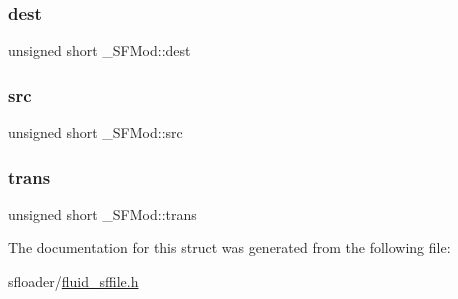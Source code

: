 \mbox{\label{struct__SFMod_a166eb7ef238826eb667d692d7ded9abb}} 
\subsubsection{\texorpdfstring{dest}{dest}}
{\footnotesize\ttfamily unsigned short \+\_\+\+S\+F\+Mod\+::dest}

\mbox{\label{struct__SFMod_a693819d8604ae3f9b892a021e8d38c72}} 
\subsubsection{\texorpdfstring{src}{src}}
{\footnotesize\ttfamily unsigned short \+\_\+\+S\+F\+Mod\+::src}

\mbox{\label{struct__SFMod_aba4b2a221217dd53483f687ccb7c330b}} 
\subsubsection{\texorpdfstring{trans}{trans}}
{\footnotesize\ttfamily unsigned short \+\_\+\+S\+F\+Mod\+::trans}



The documentation for this struct was generated from the following file\+:\begin{DoxyCompactItemize}
\item 
sfloader/\hyperlink{fluid__sffile_8h}{fluid\+\_\+sffile.\+h}\end{DoxyCompactItemize}
